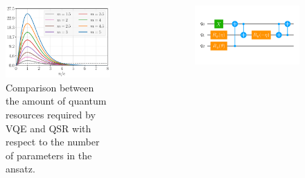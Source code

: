 \documentclass[final]{beamer}
\newlength{\sepwid}
\newlength{\onecolwid}
\newlength{\twocolwid}
\begin{document}
\begin{frame}[t]
\begin{columns}[t]
\begin{column}{\twocolwid}
\begin{columns}[t,totalwidth=\twocolwid]
\begin{column}{\onecolwid}
\begin{figure}
  \includegraphics[width=0.9\linewidth]{Figures/VQE-vs-QSR_m.pdf}
  \caption{Comparison between the amount of quantum resources required by VQE and QSR with respect to the number of parameters in the ansatz.}
\end{figure}


\end{column} %
\end{columns} %
\end{column} %
\begin{column}{\sepwid}\end{column} %
\begin{column}{\onecolwid} %


\vspace{-2em}
\begin{figure}
  \includegraphics[width=0.8\linewidth]{Figures/quantum-circuit.pdf}
\end{figure}
\vspace{-2em}


\end{column}
\end{columns}
\end{frame}
\end{document}
